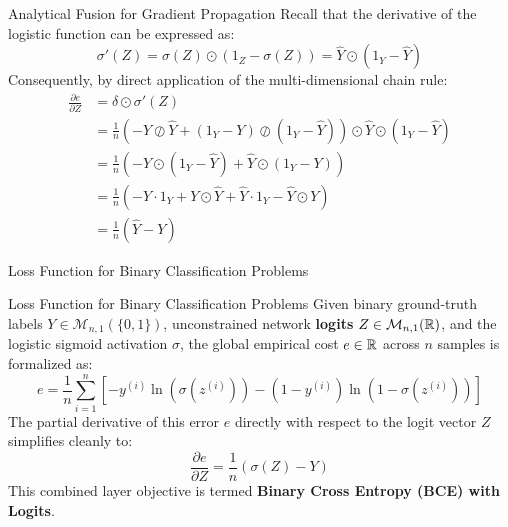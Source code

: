 \begin{frame}{Analytical Fusion for Gradient Propagation}
	Recall that the derivative of the logistic function can be expressed as:
	\begin{equation*}
		\sigma'(Z) = \sigma(Z) \odot \left(1_Z - \sigma(Z)\right) = \hat{Y} \odot (1_Y - \hat{Y})
	\end{equation*}
	\pause
	Consequently, by direct application of the multi-dimensional chain rule:
	\begin{equation*}
		\begin{aligned}
			\frac{\partial{e}}{\partial{Z}} 
			&= \delta \odot \sigma'(Z) \\
			&= \frac{1}{n} \left( - Y \oslash \hat{Y} + \left(1_Y - Y\right) \oslash \left(1_Y - \hat{Y}\right)\right) \odot \hat{Y} \odot (1_Y - \hat{Y}) \\
			&= \frac{1}{n} \left( - Y \odot (1_Y - \hat{Y}) + \hat{Y} \odot \left(1_Y - Y\right)\right) \\
			&= \frac{1}{n} \left( - Y \cdot 1_Y + Y \odot \hat{Y} + \hat{Y} \cdot 1_Y - \hat{Y} \odot Y \right) \\
			&= \frac{1}{n} \left( \hat{Y} - Y \right)
		\end{aligned}
	\end{equation*}
\end{frame}

\begin{frame}{Loss Function for Binary Classification Problems}
	\begin{block}{Loss Function for Binary Classification Problems}
		Given binary ground-truth labels $Y \in \mathcal{M}_{n,1}(\{0, 1\})$, unconstrained network \textbf{logits} $Z \in \mathcal{M}_{n,1}(\mathbb{R})$, and the logistic sigmoid activation $\sigma$, the global empirical cost $e \in \mathbb{R}$ across $n$ samples is formalized as:
		\begin{equation*}
			e = \frac{1}{n} \sum_{i=1}^n \left[ - y^{(i)} \ln{\left(\sigma\left(z^{(i)}\right)\right)} - \left(1 - y^{(i)}\right) \ln{\left(1 - \sigma\left(z^{(i)}\right)\right)} \right]
		\end{equation*}
		The partial derivative of this error $e$ directly with respect to the logit vector $Z$ simplifies cleanly to:
		\begin{equation*}
			\frac{\partial{e}}{\partial{Z}} = \frac{1}{n} \left(\sigma\left(Z\right) - Y\right)
		\end{equation*}
		This combined layer objective is termed \textbf{Binary Cross Entropy (BCE) with Logits}.
	\end{block}
\end{frame}

